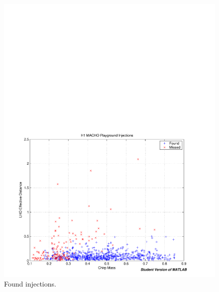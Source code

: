\begin{figure}[p]
\begin{center}
\includegraphics[width=\textwidth]{analysis/figures/mchirp_found_missed}
\end{center}
\caption{\label{f:pipeline}%
Found injections.
}
\end{figure}

